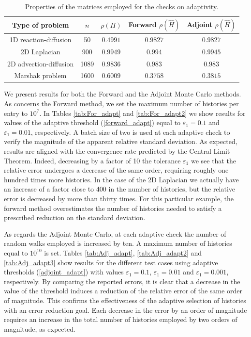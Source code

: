 \documentclass[times]{nlaauth}
\begin{document}
\begin{table}[!t]
\centering
\begin{tabular}{|c|c|c|c|c|}
\hline
\textbf{Type of problem} & $n$ &
$\rho(H)$&Forward $\rho(\hat{H})$&Adjoint $\rho(\hat{H})$\\
\hline
1D reaction-diffusion & 50 & $0.4991$ & $0.9827$ & $0.9827$\\
\hline
2D Laplacian & 900 & $0.9949$ & $0.994$ & $0.9945$\\
\hline
2D advection-diffusion & 1089 &$0.9836$ & $0.983$ & $0.983$ \\
\hline
Marshak problem & 1600 & $0.6009$ & $0.3758$ & $ 0.3815$ \\
\hline
\end{tabular}
\caption{Properties of the matrices employed for the checks on adaptivity.}
\label{table_data}
\end{table}

We present results for both the Forward
and the Adjoint Monte Carlo methods.
As concerns the Forward method, we set the maximum number of
histories per entry to $10^7$. In Tables \ref{tab:For_adapt} and \ref{tab:For_adapt2}
we show results for values of the adaptive threshold
(\ref{forward_adapt}) equal to
$\varepsilon_1=0.1$ and $\varepsilon_1=0.01$, respectively.
A batch size of two is used at each
adaptive check to verify the magnitude of the apparent relative standard
deviation. As expected, results are aligned with the convergence rate predicted
by the Central Limit Theorem. Indeed, decreasing by a factor of 10 the
tolerance $\varepsilon_1$ we see that the relative error undergoes a
decrease of the same order, requiring roughly
one hundred times more histories. In the case of the 2D Laplacian we actually
have an increase of a factor close to 400 in the number of histories, but the
relative error is decreased by more than thirty times. For this particular
example, the forward method overestimates the number of histories
needed to satisfy a prescribed reduction on the standard deviation.

As regards the Adjoint Monte Carlo, at each adaptive check the number of
random walks employed is increased by ten.
A maximum number of histories equal to $10^{10}$ is set.
Tables \ref{tab:Adj_adapt}, \ref{tab:Adj_adapt2} and
\ref{tab:Adj_adapt3} show results
for the different test cases using adaptive thresholds (\ref{adjoint_adapt})
with values $\varepsilon_1=0.1$, $\varepsilon_1=0.01$ and
$\varepsilon_1=0.001$, respectively.
By comparing the reported errors, it is
clear that a decrease in the value of the threshold
induces a reduction of the relative error of the same order of magnitude.
This confirms
the effectiveness of the adaptive selection of histories with an error
reduction goal. Each decrease in the error by an order of magnitude
requires an increase in the total number of histories employed by
two orders of magnitude, as expected.
\end{document}
